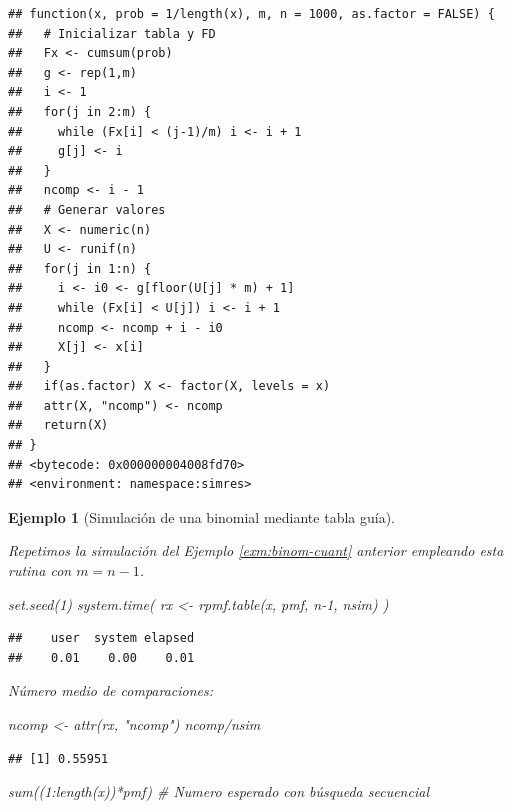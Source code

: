 \documentclass[
]{book}
\newenvironment{Shaded}{\begin{snugshade}}{\end{snugshade}}
\newcommand{\CommentTok}[1]{\textcolor[rgb]{0.56,0.35,0.01}{\textit{#1}}}
\newcommand{\DecValTok}[1]{\textcolor[rgb]{0.00,0.00,0.81}{#1}}
\newcommand{\FunctionTok}[1]{\textcolor[rgb]{0.00,0.00,0.00}{#1}}
\newcommand{\NormalTok}[1]{#1}
\newcommand{\OtherTok}[1]{\textcolor[rgb]{0.56,0.35,0.01}{#1}}
\newcommand{\SpecialCharTok}[1]{\textcolor[rgb]{0.00,0.00,0.00}{#1}}
\newcommand{\StringTok}[1]{\textcolor[rgb]{0.31,0.60,0.02}{#1}}
\theoremstyle{break}
\newtheorem{example}{Ejemplo}[chapter]
\theoremstyle{nonumberplain}
\begin{document}
\begin{verbatim}
## function(x, prob = 1/length(x), m, n = 1000, as.factor = FALSE) {
##   # Inicializar tabla y FD
##   Fx <- cumsum(prob)
##   g <- rep(1,m)
##   i <- 1
##   for(j in 2:m) {
##     while (Fx[i] < (j-1)/m) i <- i + 1
##     g[j] <- i
##   }
##   ncomp <- i - 1
##   # Generar valores
##   X <- numeric(n)
##   U <- runif(n)
##   for(j in 1:n) {
##     i <- i0 <- g[floor(U[j] * m) + 1]
##     while (Fx[i] < U[j]) i <- i + 1
##     ncomp <- ncomp + i - i0
##     X[j] <- x[i]
##   }
##   if(as.factor) X <- factor(X, levels = x)
##   attr(X, "ncomp") <- ncomp
##   return(X)
## }
## <bytecode: 0x000000004008fd70>
## <environment: namespace:simres>
\end{verbatim}

\begin{example}[Simulación de una binomial mediante tabla guía]
\protect\hypertarget{exm:binom-tabla}{}\label{exm:binom-tabla}

Repetimos la simulación del Ejemplo \ref{exm:binom-cuant} anterior empleando esta rutina con \(m=n-1\).

\begin{Shaded}
\begin{Highlighting}[]
\FunctionTok{set.seed}\NormalTok{(}\DecValTok{1}\NormalTok{)}
\FunctionTok{system.time}\NormalTok{( rx }\OtherTok{\textless{}{-}} \FunctionTok{rpmf.table}\NormalTok{(x, pmf, n}\DecValTok{{-}1}\NormalTok{, nsim) )}
\end{Highlighting}
\end{Shaded}

\begin{verbatim}
##    user  system elapsed 
##    0.01    0.00    0.01
\end{verbatim}

Número medio de comparaciones:

\begin{Shaded}
\begin{Highlighting}[]
\NormalTok{ncomp }\OtherTok{\textless{}{-}} \FunctionTok{attr}\NormalTok{(rx, }\StringTok{"ncomp"}\NormalTok{)}
\NormalTok{ncomp}\SpecialCharTok{/}\NormalTok{nsim}
\end{Highlighting}
\end{Shaded}

\begin{verbatim}
## [1] 0.55951
\end{verbatim}

\begin{Shaded}
\begin{Highlighting}[]
\FunctionTok{sum}\NormalTok{((}\DecValTok{1}\SpecialCharTok{:}\FunctionTok{length}\NormalTok{(x))}\SpecialCharTok{*}\NormalTok{pmf) }\CommentTok{\# Numero esperado con búsqueda secuencial}
\end{Highlighting}
\end{Shaded}


\end{example}
\end{document}
